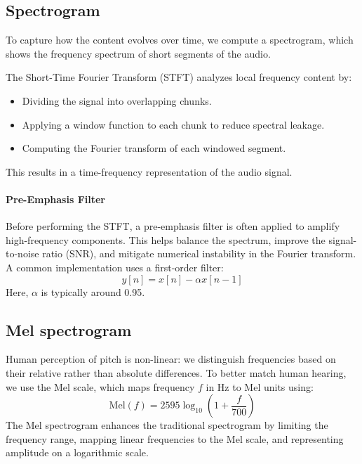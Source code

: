 \subsection{Spectrogram}
To capture how the content evolves over time, we compute a spectrogram, which shows the frequency spectrum of short segments of the audio.

The Short-Time Fourier Transform (STFT) analyzes local frequency content by:
\begin{itemize}
    \item Dividing the signal into overlapping chunks.
    \item Applying a window function to each chunk to reduce spectral leakage.
    \item Computing the Fourier transform of each windowed segment.
\end{itemize}
\noindent This results in a time-frequency representation of the audio signal.

\paragraph*{Pre-Emphasis Filter}
Before performing the STFT, a pre-emphasis filter is often applied to amplify high-frequency components. 
This helps balance the spectrum, improve the signal-to-noise ratio (SNR), and mitigate numerical instability in the Fourier transform.
A common implementation uses a first-order filter:
\[y[n] = x[n] - \alpha x[n - 1]\]
\noindent Here, $\alpha$ is typically around 0.95.

\subsection{Mel spectrogram}
Human perception of pitch is non-linear: we distinguish frequencies based on their relative rather than absolute differences. 
To better match human hearing, we use the Mel scale, which maps frequency $f$ in Hz to Mel units using:
\[\text{Mel}(f) = 2595 \log_{10}(1 + \frac{f}{700})\]
The Mel spectrogram enhances the traditional spectrogram by limiting the frequency range, mapping linear frequencies to the Mel scale, and representing amplitude on a logarithmic scale.